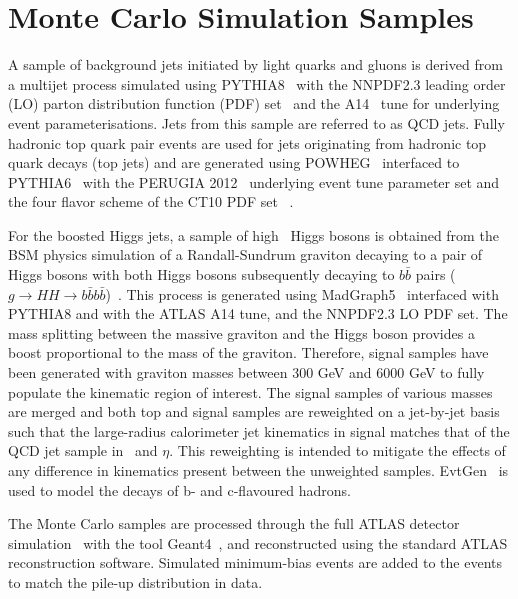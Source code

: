 \section{Monte Carlo Simulation Samples}
\label{sec:mc}

\par A sample of background jets initiated by light quarks and gluons is derived from a multijet process simulated using PYTHIA8~\cite{Sjostrand:2007gs} with the NNPDF2.3 leading order (LO) parton distribution 
function (PDF) set~\cite{Ball:2012cx} and the A14~\cite{ATL-PHYS-PUB-2014-021} tune for underlying event parameterisations. 
Jets from this sample are referred to as QCD jets. Fully hadronic top quark pair events are used for jets originating from hadronic top quark decays (top jets) and are generated 
using POWHEG~\cite{Frixione:2007vw,Nason:2004rx} interfaced to PYTHIA6~\cite{Sjostrand:2006za} with the PERUGIA 2012~\cite{Skands:2010ak} underlying event tune parameter set 
and the four flavor scheme of the CT10 PDF set ~\cite{Gao:2013xoa}.
\par For the boosted Higgs jets, a sample of high \pt~Higgs bosons is obtained from the BSM physics simulation of a Randall-Sundrum graviton decaying to a pair of Higgs bosons with both Higgs bosons 
subsequently decaying to $b\bar{b}$ pairs ($g\rightarrow HH \rightarrow b\bar{b}b\bar{b}$)~\cite{Randall:1999ee}. This process is generated using MadGraph5~\cite{Alwall:2014hca} 
interfaced with PYTHIA8 and with the ATLAS A14 tune, and the NNPDF2.3 LO PDF set. The mass splitting between the massive graviton and the Higgs boson provides a boost proportional to the mass of the graviton. 
Therefore, signal samples have been generated with graviton masses between 300 GeV and 6000 GeV to fully populate the kinematic region of interest. 
The signal samples of various masses are merged and both top and signal samples are reweighted on a jet-by-jet basis such that the large-radius calorimeter jet kinematics in signal matches that of the QCD jet sample in \pt~and $\eta$. 
This reweighting is intended to mitigate the effects of any difference in kinematics present between the unweighted samples. 
EvtGen~\cite{Lange:2001uf} is used to model the decays of b- and c-flavoured hadrons.
\par The Monte Carlo samples are processed through the full ATLAS detector simulation~\cite{Aad:2010ah} with the tool Geant4~\cite{Agostinelli:2002hh}, and reconstructed using the standard ATLAS reconstruction software. Simulated minimum-bias events are added to the events to match the pile-up distribution in data. 

